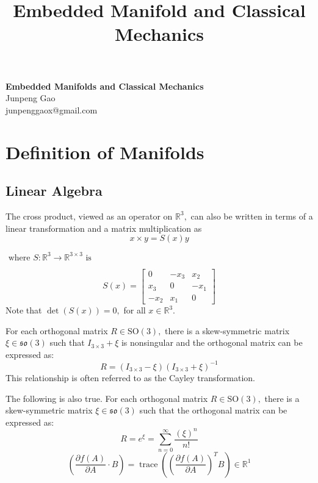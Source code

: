 \documentclass[13pt]{article}
\theoremstyle{definition}
\begin{document}
\title{Embedded Manifold and Classical Mechanics}

\thispagestyle{empty}

\begin{center}
{\LARGE \bf Embedded Manifolds and Classical Mechanics}\\
{\large Junpeng Gao}\\
junpenggaox@gmail.com
\end{center}
\section{Definition of Manifolds}
\subsection{Linear Algebra}

The cross product, viewed as an operator on $\mathbb{R}^{3},$ can also be written in terms of a linear transformation and a matrix multiplication as
$$
x \times y=S(x) y
$$

$\text { where } S: \mathbb{R}^{3} \rightarrow \mathbb{R}^{3 \times 3} \text { is }$

\begin{equation}
S(x)=\left[\begin{array}{ccc}
0 & -x_{3} & x_{2} \\
x_{3} & 0 & -x_{1} \\
-x_{2} & x_{1} & 0
\end{array}\right]
\end{equation}
Note that $\operatorname{det}(S(x))=0,$ for all $x \in \mathbb{R}^{3}$.

For each orthogonal matrix $R \in \mathrm{SO}(3),$ there is a skew-symmetric matrix $\xi \in \mathfrak{s o}(3)$ such that $I_{3 \times 3}+\xi$ is nonsingular and the orthogonal matrix can be expressed as:
\begin{equation}
R=\left(I_{3 \times 3}-\xi\right)\left(I_{3 \times 3}+\xi\right)^{-1}
\end{equation}
This relationship is often referred to as the Cayley transformation.

The following is also true. For each orthogonal matrix $R \in \mathrm{SO}(3),$ there is a skew-symmetric matrix $\xi \in \mathfrak{s o}(3)$ such that the orthogonal matrix can be expressed as:
\begin{equation}
R=e^{\xi}=\sum_{n=0}^{\infty} \frac{(\xi)^{n}}{n !}
\end{equation}
\begin{equation}
\left(\frac{\partial f(A)}{\partial A} \cdot B\right)=\operatorname{trace}\left(\left(\frac{\partial f(A)}{\partial A}\right)^{T} B\right) \in \mathbb{R}^{1}
\end{equation}
\end{document}
